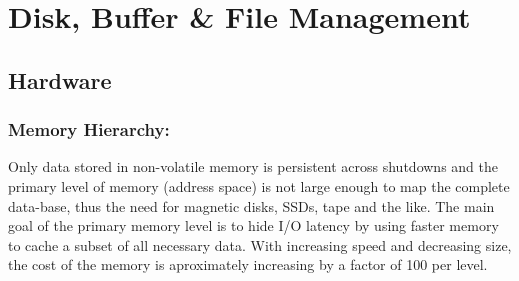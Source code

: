 \chapter{Disk, Buffer \& File Management}
\newpage
\section{Hardware}
    \subsection{Memory Hierarchy:}
        Only data stored in non-volatile memory is persistent across shutdowns and the primary level of memory (address space) is not large enough to map the complete data-base, thus the need for magnetic disks, SSDs, tape and the like. The main goal of the primary memory level is to hide I/O latency by using faster memory to cache a subset of all necessary data. With increasing speed and decreasing size, the cost of the memory is aproximately increasing by a factor of 100 per level. \\

